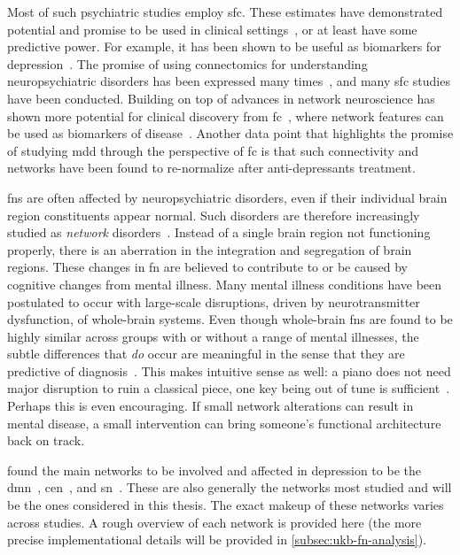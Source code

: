 Most of such psychiatric studies employ \gls{sfc}.
These estimates have demonstrated potential and promise to be used in clinical settings~\parencite{Cole2014, Deco2014, Parkes2020}, or at least have some predictive power.
For example, it has been shown to be useful as biomarkers for depression~\parencite{Drysdale2017}.
The promise of using connectomics for understanding neuropsychiatric disorders has been expressed many times~\parencite{Deco2014}, and many \gls{sfc} studies have been conducted.
Building on top of advances in network neuroscience has shown more potential for clinical discovery from \gls{fc}~\parencite{Lydon-Staley2018}, where network features can be used as biomarkers of disease~\parencite{Bassett2009}.
Another data point that highlights the promise of studying \gls{mdd} through the perspective of \gls{fc} is that such connectivity and networks have been found to re-normalize after anti-depressants treatment.

\Glspl{fn} are often affected by neuropsychiatric disorders, even if their individual brain region constituents appear normal.
Such disorders are therefore increasingly studied as \emph{network} disorders~\parencite[see][for a review on depression]{Mulders2015}.
Instead of a single brain region not functioning properly, there is an aberration in the integration and segregation of brain regions.
These changes in \gls{fn} are believed to contribute to or be caused by cognitive changes from mental illness.
Many mental illness conditions have been postulated to occur with large-scale disruptions, driven by neurotransmitter dysfunction, of whole-brain systems.
Even though whole-brain \glspl{fn} are found to be highly similar across groups with or without a range of mental illnesses, the subtle differences that \emph{do} occur are meaningful in the sense that they are predictive of diagnosis~\parencite{Spronk2020}.
This makes intuitive sense as well: a piano does not need major disruption to ruin a classical piece, one key being out of tune is sufficient~\parencite[see also][for a discussion of small effect sizes]{Paulus2019}.
Perhaps this is even encouraging.
If small network alterations can result in mental disease, a small intervention can bring someone's functional architecture back on track.

\textcite{Mulders2015} found the main networks to be involved and affected in depression to be the \gls{dmn}~\parencite{Berman2011, Demirtas2016, Wise2017, Yan2019, Zhao2019, Zhou2020}, \gls{cen}~\parencite{Zhao2019}, and \gls{sn}~\parencite{Manoliu2014}.
These are also generally the networks most studied and will be the ones considered in this thesis.
The exact makeup of these networks varies across studies.
A rough overview of each network is provided here (the more precise implementational details will be provided in \cref{subsec:ukb-fn-analysis}).

